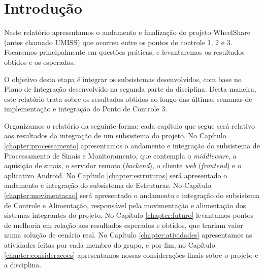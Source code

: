 \chapter{Introdução}

Neste relatório apresentamos o andamento e finalização do projeto WheelShare
(antes chamado UMISS) que ocorreu entre os pontos de controle 1, 2 e 3.
Focaremos principalmente em questões práticas, e levantaremos os resultados
obtidos e os esperados.

O objetivo desta etapa é integrar os subsistemas desenvolvidos, com base no
Plano de Integração desenvolvido na segunda parte da disciplina. Desta
maneira, este relatório trata sobre os resultados obtidos ao longo das últimas
semanas de implementação e integração do Ponto de Controle 3.

Organizamos o relatório da seguinte forma: cada capítulo que segue será relativo
aos resultados da integração de um subsistema do projeto. No Capítulo
\ref{chapter:processamento} apresentamos o andamento e integração do subsistema
de Processamento de Sinais e Monitoramento, que contempla o \textit{middleware},
a aquisição de sinais, o servidor remoto (\textit{backend}), o cliente \textit{web}
(\textit{frontend}) e o aplicativo Android. No Capítulo \ref{chapter:estruturas}
será apresentado o andamento e integração do subsistema de Estruturas. No
Capítulo \ref{chapter:movimentacao} será apresentado o andamento e integração do
subsistema de Controle e Alimentação, responsável pela movimentação e
alimentação dos sistemas integrantes do projeto. No Capítulo \ref{chapter:futuro}
levantamos pontos de melhoria em relação aos resultados esperados e obtidos, que
trariam valor numa solução de cenário real. No Capítulo
\ref{chapter:atividades} apresentamos as atividades feitas por cada membro do
grupo, e por fim, no Capítulo \ref{chapter:consideracoes} apresentamos nossas
considerações finais sobre o projeto e a disciplina.

